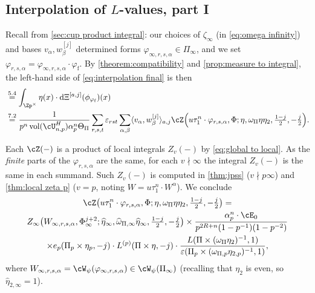 \documentclass[10pt,reqno,a4paper]{amsart}
\newcommand{\omegahat}{\widehat{\omega}}
\newcommand{\etahat}{\widehat{\eta}}
\newcommand{\subf}{_{\mathrm{f}}}
\begin{document}
\subsection{Interpolation of \texorpdfstring{$L$}{L}-values, part I}\label{sec:interpolation 1}
Recall from  \cref{sec:cup product integral}: our choices of $\zeta_\infty$ (in \eqref{eq:omega infinity}) and bases $v_\alpha,w_\beta^{[j]}$ determined forms $\varphi_{\infty,r,s,\alpha} \in \Pi_\infty$, and we set $\varphi_{r,s,\alpha} = \varphi_{\infty,r,s,\alpha} \cdot \varphi\subf$. By \cref{theorem:compatibility} and \cref{prop:measure to integral}, the left-hand side of \eqref{eq:interpolation final} is then
\begin{align}
&\stackrel{5.4}{=} \int_{\Zp^\times} \eta(x)  \cdot \mathrm{d}\Xi^{[a,j]}(\phi_{\varphi\subf})(x) \notag \\
&\stackrel{7.2}{=}    \frac{1 }{p^{n}\operatorname{vol}(\cU_{n,p}^H)\alpha_{p}^n  \Theta_\Pi} \sum_{r,s,t} \varepsilon_{rst} \sum_{\alpha,\beta} \langle v_\alpha, w_\beta^{[j]}\rangle_{a,j} \cZ\Big(u\tau_1^n\cdot \varphi_{r,s,\alpha}, \Phi; \eta, \omega_\Pi\eta\eta_2, \tfrac{1-j}{2}, -\tfrac{j}{2}\Big). \label{eq:interpolation intermediate}
\end{align}


Each $\cZ(-)$ is a product of local integrals $Z_v(-)$ by \eqref{eq:global to local}. As the \emph{finite} parts of the $\varphi_{r,s,\alpha}$ are the same, for each $v\nmid\infty$ the integral $Z_v(-)$ is the same in each summand. Such $Z_v(-)$ is computed in \cref{thm:jpss} ($v\nmid p\infty$) and \cref{thm:local zeta p} ($v = p$, noting $W = u\tau_1^n \cdot W^\alpha$). We conclude
\begin{multline*}
\cZ\big(u\tau_1^n \cdot \varphi_{r,s,\alpha}, \Phi; \eta,\omega_\Pi\eta\eta_2,\tfrac{1-j}{2},-\tfrac{j}{2}\big)  =  \\  Z_\infty\big(W_{\infty, r,s,\alpha}, \Phi_\infty^{j+2}; \etahat_{\infty}, \omegahat_{\Pi,\infty}\etahat_{\infty}, \tfrac{1-j}{2}, -\tfrac{j}{2}\big)
\times \frac{\alpha_p^n \cdot \cE_0 }{p^{2R + n}(1 - p^{-1})(1 - p^{-2})}\\
\times e_p(\Pi_p \times \eta_{p}, -j) \cdot L^{(p)}(\Pi \times \eta, -j) \cdot \frac{L(\Pi \times (\omega_{\Pi}\eta_2)^{-1}, 1)}{\varepsilon(\Pi_p \times (\omega_{\Pi,p}\eta_{2,p})^{-1},1)},
\end{multline*}
where  $W_{\infty,r,s,\alpha} = \cW_\psi(\varphi_{\infty,r,s,\alpha}) \in \cW_\psi(\Pi_\infty)$ (recalling that $\eta_2$ is even, so $\etahat_{2,\infty} = 1$).
\end{document}

